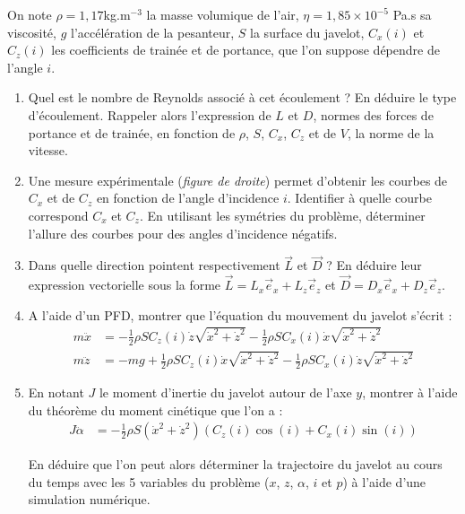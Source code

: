 On note $\rho=1,17$kg.m$^{-3}$ la masse volumique de l'air, $\eta=1,85\times10^{-5}$ Pa.s sa viscosité, $g$ l'accélération de la pesanteur, $S$ la surface du javelot, $C_x(i)$ et $C_z(i)$ les coefficients de trainée et de portance, que l'on suppose dépendre de l'angle $i$.

\begin{enumerate}

	\item Quel est le nombre de Reynolds associé à cet écoulement ? En déduire le type d'écoulement. Rappeler alors l'expression de $L$ et $D$, normes des forces de portance et de trainée, en fonction de $\rho$, $S$, $C_x$, $C_z$ et de $V$, la norme de la vitesse.
	
	\item Une mesure expérimentale (\textit{figure de droite}) permet d'obtenir les courbes de $C_x$ et de $C_z$ en fonction de l'angle d'incidence $i$. Identifier à quelle courbe correspond $C_x$ et $C_z$. En utilisant les symétries du problème, déterminer l'allure des courbes pour des angles d'incidence négatifs.

	\item Dans quelle direction pointent respectivement $\vec{L}$ et $\vec{D}$ ? En déduire leur expression vectorielle sous la forme $\vec{L}=L_x\vec{e}_x+L_z\vec{e}_z$ et $\vec{D}=D_x\vec{e}_x+D_z\vec{e}_z$.
	
	\item A l'aide d'un PFD, montrer que l'équation du mouvement du javelot s'écrit :
	\begin{align*}
		m\ddot{x} &= -\frac{1}{2}\rho SC_z(i)\dot{z}\sqrt{\dot{x}^2+\dot{z}^2}-\frac{1}{2}\rho SC_x(i)\dot{x}\sqrt{\dot{x}^2+\dot{z}^2} \\
		m\ddot{z} &= -mg+\frac{1}{2}\rho SC_z(i)\dot{x}\sqrt{\dot{x}^2+\dot{z}^2}-\frac{1}{2}\rho SC_x(i)\dot{z}\sqrt{\dot{x}^2+\dot{z}^2}
	\end{align*}
	
	\item En notant $J$ le moment d'inertie du javelot autour de l'axe $y$, montrer à l'aide du théorème du moment cinétique que l'on a :
	\begin{align*}
		J\ddot{\alpha} &= -\frac{1}{2}\rho S(\dot{x}^2+\dot{z}^2)(C_z(i)\cos(i)+C_x(i)\sin(i))
	\end{align*}
	
	En déduire que l'on peut alors déterminer la trajectoire du javelot au cours du temps avec les 5 variables du problème ($x$, $z$, $\alpha$, $i$ et $p$) à l'aide d'une simulation numérique.
	

\end{enumerate}

